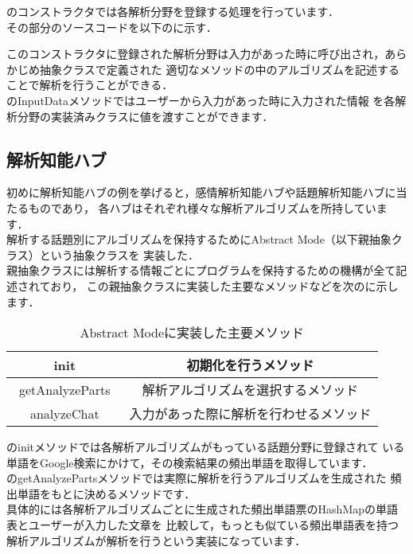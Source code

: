のコンストラクタでは各解析分野を登録する処理を行っています．\\
その部分のソースコードを以下のに示す．


このコンストラクタに登録された解析分野は入力があった時に呼び出され，あらかじめ抽象クラスで定義された
適切なメソッドの中のアルゴリズムを記述することで解析を行うことができる．
\\


のInputDataメソッドではユーザーから入力があった時に入力された情報
を各解析分野の実装済みクラスに値を渡すことができます．\\


\subsection{解析知能ハブ}
初めに解析知能ハブの例を挙げると，感情解析知能ハブや話題解析知能ハブに当たるものであり，
各ハブはそれぞれ様々な解析アルゴリズムを所持しています．\\

解析する話題別にアルゴリズムを保持するためにAbstract Mode（以下親抽象クラス）という抽象クラスを
実装した．\\

親抽象クラスには解析する情報ごとにプログラムを保持するための機構が全て記述されており，
この親抽象クラスに実装した主要なメソッドなどを次のに示します．

\begin{table}[tbh]
	\caption{Abstract Modeに実装した主要メソッド} \label{tab:Abstract Mode}
	\begin{center}
		\begin{tabular}[htb]{c|c}
		\hline
		init & 初期化を行うメソッド \\ \hline
		getAnalyzeParts　& 解析アルゴリズムを選択するメソッド \\ \hline
		analyzeChat & 入力があった際に解析を行わせるメソッド \\ \hline
		\end{tabular}
	\end{center}
\end{table}


のinitメソッドでは各解析アルゴリズムがもっている話題分野に登録されて
いる単語をGoogle検索にかけて，その検索結果の頻出単語を取得しています．
\\
のgetAnalyzePartsメソッドでは実際に解析を行うアルゴリズムを生成された
頻出単語をもとに決めるメソッドです．
\\
具体的には各解析アルゴリズムごとに生成された頻出単語票のHashMapの単語表とユーザーが入力した文章を
比較して，もっとも似ている頻出単語表を持つ解析アルゴリズムが解析を行うという実装になっています．
\\




